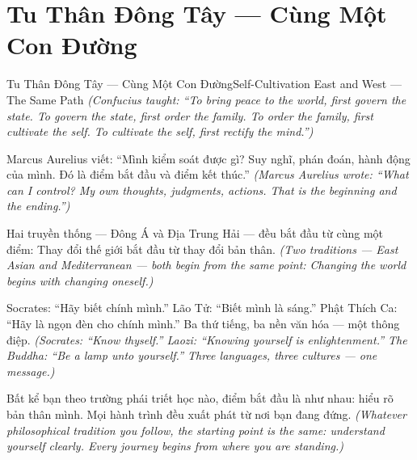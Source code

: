 \section{Tu Thân Đông Tây — Cùng Một Con Đường}
\begin{truyen}{Tu Thân Đông Tây — Cùng Một Con Đường}{Self-Cultivation East and West — The Same Path}
\textit{(Confucius taught: ``To bring peace to the world, first govern the state. To govern the state, first order the family. To order the family, first cultivate the self. To cultivate the self, first rectify the mind.'')}

Marcus Aurelius viết: ``Mình kiểm soát được gì? Suy nghĩ, phán đoán, hành động của mình. Đó là điểm bắt đầu và điểm kết thúc.''
\textit{(Marcus Aurelius wrote: ``What can I control? My own thoughts, judgments, actions. That is the beginning and the ending.'')}

Hai truyền thống — Đông Á và Địa Trung Hải — đều bắt đầu từ cùng một điểm: Thay đổi thế giới bắt đầu từ thay đổi bản thân.
\textit{(Two traditions — East Asian and Mediterranean — both begin from the same point: Changing the world begins with changing oneself.)}

Socrates: ``Hãy biết chính mình.'' Lão Tử: ``Biết mình là sáng.'' Phật Thích Ca: ``Hãy là ngọn đèn cho chính mình.'' Ba thứ tiếng, ba nền văn hóa — một thông điệp.
\textit{(Socrates: ``Know thyself.'' Laozi: ``Knowing yourself is enlightenment.'' The Buddha: ``Be a lamp unto yourself.'' Three languages, three cultures — one message.)}

\end{truyen}

\begin{baihoc}
Bất kể bạn theo trường phái triết học nào, điểm bắt đầu là như nhau: hiểu rõ bản thân mình. Mọi hành trình đều xuất phát từ nơi bạn đang đứng.
\textit{(Whatever philosophical tradition you follow, the starting point is the same: understand yourself clearly. Every journey begins from where you are standing.)}
\end{baihoc}
\ngancach

